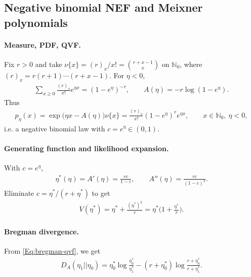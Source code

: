 \documentclass[a4paper,11pt]{article}
\numberwithin{equation}{section}
\theoremstyle{plain}
\theoremstyle{definition}
\theoremstyle{remark}
\newcommand{\1}{\ensuremath{\mathds{1}}\xspace}
\begin{document}
\subsection{Negative binomial NEF and Meixner polynomials}
\paragraph{Measure, PDF, QVF.} Fix $r>0$ and take $\nu\{x\}=(r)_x/x!=\binom{r+x-1}{x}$ on $\mathbb{N}_0$, where $(r)_x=r(r+1)\cdots(r+x-1)$.
For $\eta<0$,
\begin{align}
\sum_{x\ge 0}\frac{(r)_x}{x!}e^{\eta x}=(1-e^\eta)^{-r},
\qquad
A(\eta)=-r\log(1-e^\eta).
\end{align}
Thus
\begin{align}
p_\eta(x)=\exp\big(\eta x-A(\eta)\big)\nu\{x\}
=\frac{(r)_x}{x!}(1-e^\eta)^r e^{\eta x},
\qquad x\in\mathbb{N}_0,\ \eta<0,
\end{align}
i.e. a negative binomial law with $c=e^\eta\in(0,1)$.

\paragraph{Generating function and likelihood expansion.} With $c=e^\eta$,
\begin{align}
\eta^\ast(\eta)=A'(\eta)=\frac{r c}{1-c},\qquad
A''(\eta)=\frac{r c}{(1-c)^2}.
\end{align}
Eliminate $c=\eta^\ast/(r+\eta^\ast)$ to get
\begin{align}
V(\eta^\ast)=\eta^\ast+\frac{(\eta^\ast)^2}{r}
=\eta^\ast\Big(1+\frac{\eta^\ast}{r}\Big).
\end{align}
\paragraph{Bregman divergence.}
From \eqref{Eq:bregman-qvf}, we get 
\begin{align}
D_A(\eta_1||\eta_0)=\eta_0^\ast\log \frac{\eta_0^\ast}{\eta_1^\ast}-(r+\eta_0^\ast)\log \frac{r+\eta_0^\ast}{r+\eta_1^\ast}.
\end{align}
\end{document}
